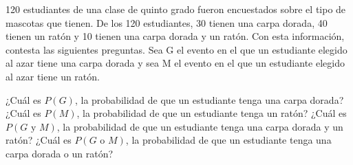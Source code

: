 120 estudiantes de una clase de quinto grado fueron encuestados sobre el tipo de mascotas que tienen.
De los 120 estudiantes, 30 tienen una carpa dorada, 40 tienen un ratón y 10 tienen una carpa dorada y un ratón.
Con esta información, contesta las siguientes preguntas.
Sea G el evento en el que un estudiante elegido al azar tiene una carpa dorada y sea M el evento en el que un
estudiante elegido al azar tiene un ratón.
\begin{parts}
    ¿Cuál es $P(G)$, la probabilidad de que un estudiante tenga una carpa dorada?                              \fillin[30/120]
    ¿Cuál es $P(M)$, la probabilidad de que un estudiante tenga un ratón?                           \fillin[40/120]
    ¿Cuál es $P(G\text{ y }M)$, la probabilidad de que un estudiante tenga una carpa dorada y un ratón?   \fillin[10/120]
    ¿Cuál es $P(G\text{ o }M)$, la probabilidad de que un estudiante tenga una carpa dorada o un ratón?   \fillin[60/120]
\end{parts}